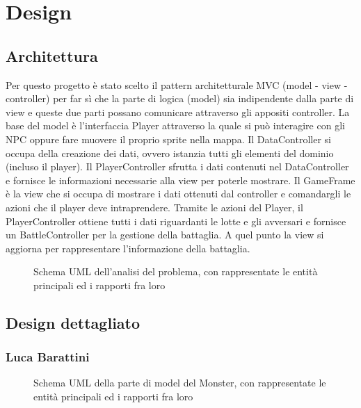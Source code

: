 \chapter{Design}

\section{Architettura}

Per questo progetto è stato scelto il pattern architetturale MVC (model - view - controller) per far sì che la parte di logica (model) sia indipendente dalla parte di view e queste due parti possano comunicare attraverso gli appositi controller.
La base del model è l'interfaccia Player attraverso la quale si può interagire con gli NPC oppure fare muovere il proprio sprite nella mappa.
Il DataController si occupa della creazione dei dati, ovvero istanzia tutti gli elementi del dominio (incluso il player). Il PlayerController sfrutta i dati contenuti nel DataController e fornisce le informazioni necessarie alla view per poterle mostrare.
Il GameFrame è la view che si occupa di mostrare i dati ottenuti dal controller e comandargli le azioni che il player deve intraprendere.
Tramite le azioni del Player, il PlayerController ottiene tutti i dati riguardanti le lotte e gli avversari e fornisce un BattleController per la gestione della battaglia. A quel punto la view si aggiorna per rappresentare l'informazione della battaglia.

\begin{figure}[H]
\centering

\caption{Schema UML dell'analisi del problema, con rappresentate le entità principali ed i rapporti fra loro}
\label{img:umlMvc}
\end{figure}

\section{Design dettagliato}


\subsection*{Luca Barattini}

\begin{figure}[H]
\centering

\caption{Schema UML della parte di model del Monster, con rappresentate le entità principali ed i rapporti fra loro}
\label{img:monsterModel}
\end{figure}

